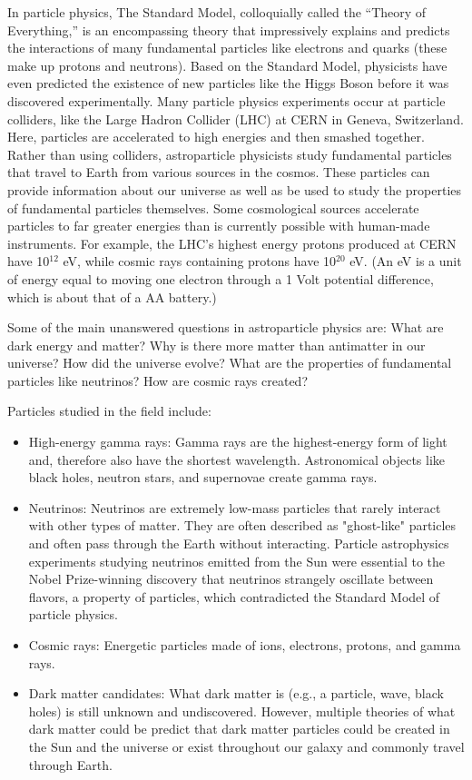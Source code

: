 In particle physics, The Standard Model, colloquially called the ``Theory of Everything,'' is an encompassing theory that impressively explains and predicts the interactions of many fundamental particles like electrons and quarks (these make up protons and neutrons). Based on the Standard Model, physicists have even predicted the existence of new particles like the Higgs Boson before it was discovered experimentally. Many particle physics experiments occur at particle colliders, like the Large Hadron Collider (LHC) at CERN in Geneva, Switzerland. Here, particles are accelerated to high energies and then smashed together. Rather than using colliders, astroparticle physicists study fundamental particles that travel to Earth from various sources in the cosmos. These particles can provide information about our universe as well as be used to study the properties of fundamental particles themselves. Some cosmological sources accelerate particles to far greater energies than is currently possible with human-made instruments. For example, the LHC's highest energy protons produced at CERN have 10$^{12}$ eV, while cosmic rays containing protons have 10$^{20}$ eV. (An eV is a unit of energy equal to moving one electron through a 1 Volt potential difference, which is about that of a AA battery.)


Some of the main unanswered questions in astroparticle physics are: What are dark energy and matter? Why is there more matter than antimatter in our universe? How did the universe evolve? What are the properties of fundamental particles like neutrinos? How are cosmic rays created?

Particles studied in the field include:
\begin{itemize}
    \item High-energy gamma rays: Gamma rays are the highest-energy form of light and, therefore also have the shortest wavelength. Astronomical objects like black holes, neutron stars, and supernovae create gamma rays. 
    \item Neutrinos: Neutrinos are extremely low-mass particles that rarely interact with other types of matter. They are often described as "ghost-like" particles and often pass through the Earth without interacting. Particle astrophysics experiments studying neutrinos emitted from the Sun were essential to the Nobel Prize-winning discovery that neutrinos strangely oscillate between flavors, a property of particles, which contradicted the Standard Model of particle physics.
    \item Cosmic rays: Energetic particles made of ions, electrons, protons, and gamma rays. 
    \item Dark matter candidates: What dark matter is (e.g., a particle, wave, black holes) is still unknown and undiscovered. However, multiple theories of what dark matter could be predict that dark matter particles could be created in the Sun and the universe or exist throughout our galaxy and commonly travel through Earth. 
\end{itemize}

